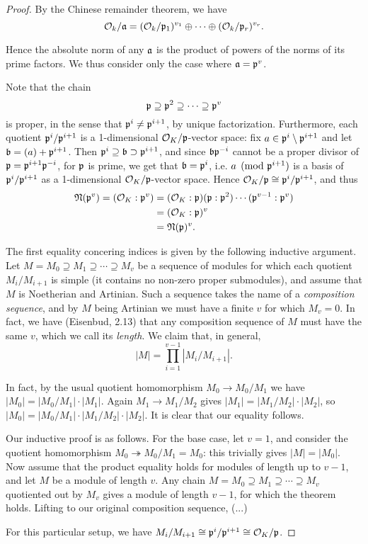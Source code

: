 \begin{proof}
	By the Chinese remainder theorem, we have
	\[
		\mathcal{O}_k/\mathfrak{a} = (\mathcal{O}_k/\mathfrak{p}_1)^{v_1}\oplus\cdots\oplus(\mathcal{O}_k/\mathfrak{p}_r)^{v_r}.
	\]
	
	Hence the absolute norm of any $\mathfrak{a}$ is the product of powers of the norms of its prime factors. We thus consider only the case where $\mathfrak{a}=\mathfrak{p}^v$.

	Note that the chain
	\[
		\mathfrak{p} \supseteq \mathfrak{p}^2 \supseteq \cdots \supseteq \mathfrak{p}^v
	\]
	is proper, in the sense that $\mathfrak{p}^i\neq\mathfrak{p}^{i+1}$, by unique factorization. Furthermore, each quotient $\mathfrak{p}^i/\mathfrak{p}^{i+1}$ is a 1-dimensional $\mathcal{O}_K/\mathfrak{p}$-vector space: fix $a\in\mathfrak{p}^i\setminus \mathfrak{p}^{i+1}$ and let $\mathfrak{b}=(a)+\mathfrak{p}^{i+1}$. Then $\mathfrak{p}^i\supseteq\mathfrak{b}\supset\mathfrak{p}^{i+1}$, and since $\mathfrak{b}\mathfrak{p}^{-i}$ cannot be a proper divisor of $\mathfrak{p}=\mathfrak{p}^{i+1}\mathfrak{p}^{-i}$, for $\mathfrak{p}$ is prime, we get that $\mathfrak{b}=\mathfrak{p}^i$, i.e. $a\pmod{\mathfrak{p}^{i+1}}$ is a basis of $\mathfrak{p}^i/\mathfrak{p}^{i+1}$ as a 1-dimensional $\mathcal{O}_K/\mathfrak{p}$-vector space. Hence $\mathcal{O}_K/\mathfrak{p}\cong\mathfrak{p}^i/\mathfrak{p}^{i+1}$, and thus
	\begin{align*}
		\mathfrak{N}(\mathfrak{p}^v) = (\mathcal{O}_K : \mathfrak{p}^v) &= (\mathcal{O}_K:\mathfrak{p})(\mathfrak{p}:\mathfrak{p}^2)\cdots(\mathfrak{p}^{v-1}:\mathfrak{p}^v)\\
			&= (\mathcal{O}_K:\mathfrak{p})^v\\
			&= \mathfrak{N}(\mathfrak{p})^v.
	\end{align*}

	The first equality concering indices is given by the following inductive argument. Let $M=M_0\supseteq M_1\supseteq \cdots\supseteq M_v$ be a sequence of modules for which each quotient $M_i/M_{i+1}$ is simple (it contains no non-zero proper submodules), and assume that $M$ is Noetherian and Artinian. Such a sequence takes the name of a \emph{composition sequence}, and by $M$ being Artinian we must have a finite $v$ for which $M_v=0$. In fact, we have (Eisenbud, 2.13) that any composition sequence of $M$ must have the same $v$, which we call its \emph{length}. We claim that, in general,
	\[
		|M| = \prod_{i=1}^{v-1} |M_i/M_{i+1}|.
	\]

	In fact, by the usual quotient homomorphism $M_0\to M_0/M_1$ we have $|M_0|=|M_0/M_1|\cdot|M_1|$. Again $M_1\to M_1/M_2$ gives $|M_1|=|M_1/M_2|\cdot|M_2|$, so $|M_0|=|M_0/M_1|\cdot|M_1/M_2|\cdot|M_2|$. It is clear that our equality follows.

	Our inductive proof is as follows. For the base case, let $v=1$, and consider the quotient homomorphism $M_0\twoheadrightarrow M_0/M_1=M_0$: this trivially gives $|M|=|M_0|$. Now assume that the product equality holds for modules of length up to $v-1$, and let $M$ be a module of length $v$. Any chain $M=M_0\supseteq M_1\supseteq\cdots\supseteq M_v$ quotiented out by $M_v$ gives a module of length $v-1$, for which the theorem holds. Lifting to our original composition sequence, (...)
	
	For this particular setup, we have $M_i/M_{i+1}\cong\mathfrak{p}^i/\mathfrak{p}^{i+1}\cong\mathcal{O}_K/\mathfrak{p}$.
\end{proof}

